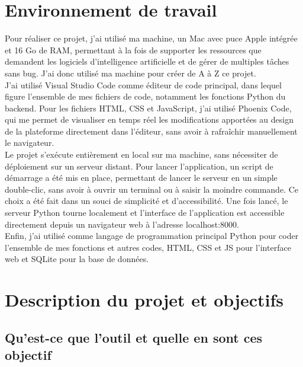 \documentclass[a4paper, 12pt, twoside]{article}
\begin{document}
\newpage






\section{Environnement de travail}

Pour réaliser ce projet, j’ai utilisé ma machine, un Mac avec puce Apple intégrée et 16 Go de RAM, permettant à la fois de supporter les ressources que demandent les logiciels d’intelligence artificielle et de gérer de multiples tâches sans bug. J’ai donc utilisé ma machine pour créer de A à Z ce projet.\\


J'ai utilisé Visual Studio Code comme éditeur de code principal, dans lequel figure l'ensemble de mes fichiers de code, notamment les fonctions Python du backend. Pour les fichiers HTML, CSS et JavaScript, j'ai utilisé Phoenix Code, qui me permet de visualiser en temps réel les modifications apportées au design de la plateforme directement dans l'éditeur, sans avoir à rafraîchir manuellement le navigateur.\\


Le projet s'exécute entièrement en local sur ma machine, sans nécessiter de déploiement sur un serveur distant. Pour lancer l'application, un script de démarrage a été mis en place, permettant de lancer le serveur en un simple double-clic, sans avoir à ouvrir un terminal ou à saisir la moindre commande. Ce choix a été fait dans un souci de simplicité et d'accessibilité. Une fois lancé, le serveur Python tourne localement et l'interface de l'application est accessible directement depuis un navigateur web à l'adresse localhost:8000. \\

Enfin, j’ai utilisé comme langage de programmation principal Python pour coder l’ensemble de mes fonctions et autres codes, HTML, CSS et JS pour l’interface web et SQLite pour la base de données. 






\newpage


\section{Description du projet et objectifs}

	\subsection{Qu'est-ce que l'outil et quelle en sont ces objectif}\\
\end{document}
